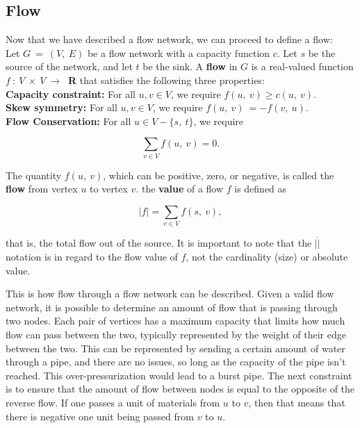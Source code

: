 \documentclass[conference]{IEEEtran}
\begin{document}
\subsection{Flow}
Now that we have described a flow network, we can proceed to define a flow:\\

Let $G\ =\ (V,\ E)$ be a flow network with a capacity function $c$. Let $s$ be the source of the network, and let $t$ be the sink. A \textbf{flow} in $G$ is a real-valued function $f\ :\ V\ \times\ V\ \rightarrow\ $ \textbf{R} that satisfies the following three properties:\\

\textbf{Capacity constraint:} For all $u, v \in V$, we require $f(u,\ v) \geq c(u,\ v)$.\\

\textbf{Skew symmetry:}  For all $u, v \in V$, we require $f(u,\ v)\ = - f(v,\ u)$.\\

\textbf{Flow Conservation:} For all $u \in V - \{s,\ t\}$, we require

\[\displaystyle\sum_{v \in V} f(u,\ v) = 0.\]

The quantity $f(u,\ v)$, which can be positive, zero, or negative, is called the \textbf{flow} from vertex $u$ to vertex $v$. the \textbf{value} of a flow $f$ is defined as

\[|f| = \displaystyle\sum_{v \in V} f(s,\ v),\]

that is, the total flow out of the source. It is important to note that the $|\dot|$ notation is in regard to the flow value of $f$, not the cardinality (size) or absolute value.\cite{CLRS:2001}

This is how flow through a flow network can be described. Given a valid flow network, it is possible to determine an amount of flow that is passing through two nodes. Each pair of vertices has a maximum capacity that limits how much flow can pass between the two, typically represented by the weight of their edge between the two. This can be represented by sending a certain amount of water through a pipe, and there are no issues, so long as the capacity of the pipe isn't reached. This over-pressurization would lead to a burst pipe. The next constraint is to ensure that the amount of flow between nodes is equal to the opposite of the reverse flow. If one passes a unit of materials from $u$ to $v$, then that means that there is negative one unit being passed from $v$ to $u$. 
\end{document}
